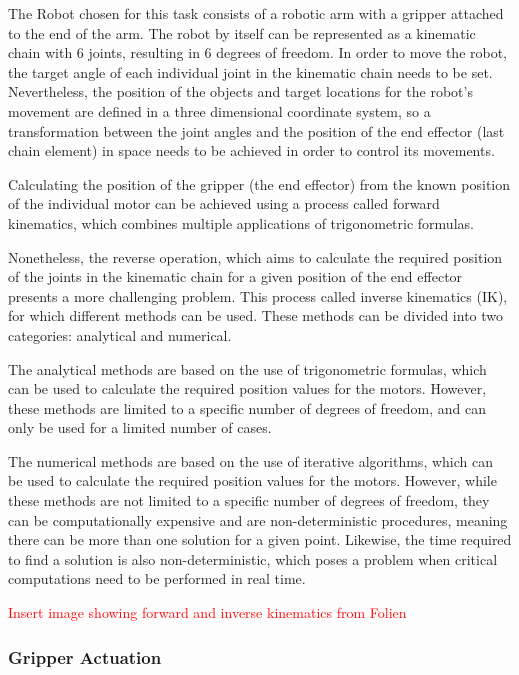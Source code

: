 The Robot chosen for this task consists of a robotic arm with a gripper attached to the end of the arm. The robot by itself can be represented as a kinematic chain with 6 joints, resulting in 6 degrees of freedom.
In order to move the robot, the target angle of each individual joint in the kinematic chain needs to be set. Nevertheless, the position of the objects and target locations for the robot's movement are defined in a three dimensional coordinate system, so a transformation between the joint angles and the position of the end effector (last chain element) in space needs to be achieved in order to control its movements.

Calculating the position of the gripper (the end effector) from the known position of the individual motor can be achieved using a process called forward kinematics, which combines multiple applications of trigonometric formulas.

Nonetheless, the reverse operation, which aims to calculate the required position of the joints in the kinematic chain for a given position of the end effector presents a more challenging problem. 
This process called inverse kinematics (IK), for which different methods can be used. These methods can be divided into two categories: analytical and numerical.

The analytical methods are based on the use of trigonometric formulas, which can be used to calculate the required position values for the motors. However, these methods are limited to a specific number of degrees of freedom, and can only be used for a limited number of cases.

The numerical methods are based on the use of iterative algorithms, which can be used to calculate the required position values for the motors. However, while these methods are not limited to a specific number of degrees of freedom, they can be computationally expensive and are non-deterministic procedures, meaning there can be more than one solution for a given point. Likewise, the time required to find a solution is also non-deterministic, which poses a problem when critical computations need to be performed in real time.

\textcolor{red}{Insert image showing forward and inverse kinematics from Folien} %


\subsubsection{Gripper Actuation}

